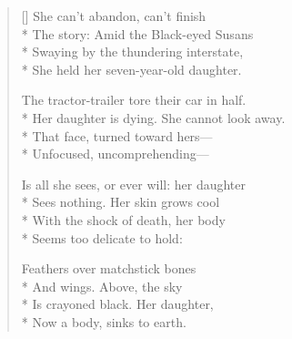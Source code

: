 \label{ch:unfinished}
\settowidth{\versewidth}{Her daughter is dying.  She cannot look away.}
\begin{verse}[\versewidth]
She can't abandon, can't finish\\*
The story: Amid the Black-eyed Susans\\*
Swaying by the thundering interstate,\\*
She held her seven-year-old daughter.

The tractor-trailer tore their car in half.\\*
Her daughter is dying.  She cannot look away.\\*
That face, turned toward hers---\\*
Unfocused, uncomprehending---

Is all she sees, or ever will: her daughter\\*
Sees nothing. Her skin grows cool\\*
With the shock of death, her body\\*
Seems too delicate to hold:

Feathers over matchstick bones\\*
And wings.     Above, the sky\\*
Is crayoned black.  Her daughter, \\*
Now a body, sinks to earth.
\end{verse}
